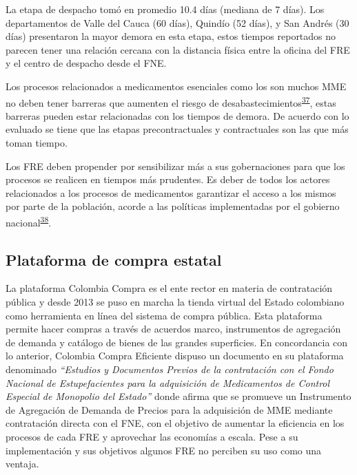 \documentclass[
]{book}
\begin{document}
La etapa de despacho tomó en promedio 10.4 días (mediana de 7 días). Los departamentos de Valle del Cauca (60 días), Quindío (52 días), y San Andrés (30 días) presentaron la mayor demora en esta etapa, estos tiempos reportados no parecen tener una relación cercana con la distancia física entre la oficina del FRE y el centro de despacho desde el FNE.

Los procesos relacionados a medicamentos esenciales como los son muchos MME no deben tener barreras que aumenten el riesgo de desabastecimientos\textsuperscript{\protect\hyperlink{ref-OMS2021}{37}}, estas barreras pueden estar relacionadas con los tiempos de demora. De acuerdo con lo evaluado se tiene que las etapas precontractuales y contractuales son las que más toman tiempo.

Los FRE deben propender por sensibilizar más a sus gobernaciones para que los procesos se realicen en tiempos más prudentes. Es deber de todos los actores relacionados a los procesos de medicamentos garantizar el acceso a los mismos por parte de la población, acorde a las políticas implementadas por el gobierno nacional\textsuperscript{\protect\hyperlink{ref-PDSPMinSalud2019}{38}}.

\hypertarget{plataforma-de-compra-estatal}{%
\subsection{Plataforma de compra estatal}\label{plataforma-de-compra-estatal}}

La plataforma Colombia Compra es el ente rector en materia de contratación pública y desde 2013 se puso en marcha la tienda virtual del Estado colombiano como herramienta en línea del sistema de compra pública. Esta plataforma permite hacer compras a través de acuerdos marco, instrumentos de agregación de demanda y catálogo de bienes de las grandes superficies. En concordancia con lo anterior, Colombia Compra Eficiente dispuso un documento en su plataforma denominado \emph{``Estudios y Documentos Previos de la contratación con el Fondo Nacional de Estupefacientes para la adquisición de Medicamentos de Control Especial de Monopolio del Estado''} donde afirma que se promueve un Instrumento de Agregación de Demanda de Precios para la adquisición de MME mediante contratación directa con el FNE, con el objetivo de aumentar la eficiencia en los procesos de cada FRE y aprovechar las economías a escala. Pese a su implementación y sus objetivos algunos FRE no perciben su uso como una ventaja.
\end{document}
